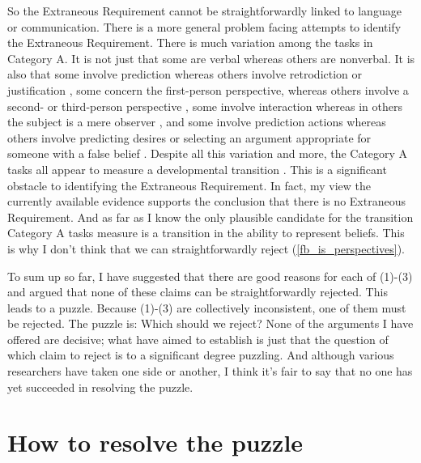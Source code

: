 \documentclass[12pt,\papersize]{extarticle}
\begin{document}
So the Extraneous Requirement cannot be straightforwardly linked to language or communication.
There is a more general problem facing attempts to identify the Extraneous Requirement.
There is much variation among the tasks in Category A.
It is not just that some are verbal whereas others are nonverbal.
It is also that some involve prediction whereas others involve retrodiction or justification \citep[e.g.]{Wimmer:1998kx},
some concern the first-person perspective, whereas others involve a second- or third-person perspective \citep[e.g.]{Gopnik:1991db},
some involve interaction whereas in others the subject is a mere observer \citep[e.g.]{Chandler:1989qa},
and some involve prediction actions whereas others involve predicting desires \citep{Astington:1991kk} or selecting an argument appropriate for someone with a false belief \citep{Bartsch:2000es}.
Despite all this variation and more, the Category A tasks all appear to measure a developmental transition \citep{Wellman:2001lz}.
This is a significant obstacle to identifying the Extraneous Requirement.
In fact, my view the currently available evidence supports the conclusion that there is no Extraneous Requirement.
And as far as I know the only plausible candidate for the transition  Category A tasks measure is a transition in the ability to represent beliefs.
This is why I don't think that we can straightforwardly reject  (\ref{fb_is_perspectives}).

To sum up so far, 
I have suggested that there are good reasons for each of (1)-(3) and 
argued that none of these claims can be straightforwardly rejected.
This leads to a puzzle.
Because (1)-(3) are collectively inconsistent, one of them must be rejected.
The puzzle is: Which should we reject? 
None of the arguments I have offered are decisive; what have aimed to establish is just that the question of which claim to reject is to a significant degree puzzling.
And although various researchers have taken one side or another,
I think it's fair to say that no one has yet succeeded in resolving the puzzle.


\section{How to resolve the puzzle}




\end{document}
